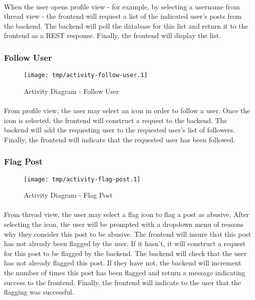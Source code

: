         \paragraph*{}
        When the user opens profile view - for example, by selecting a username from
        thread view - the frontend will request a list of the indicated user's posts
        from the backend. The backend will poll the database for this list and return
        it to the frontend as a REST response. Finally, the frontend will display the
        list.

        \subsubsection{Follow User}
        \begin{figure}[H]
            \centering
            \texttt{[image: tmp/activity-follow-user.1]} 
            \caption{Activity Diagram - Follow User}
        \end{figure}

        \paragraph*{}
        From profile view, the user may select an icon in order to follow a user. Once
        the icon is selected, the frontend will construct a request to the backend. The
        backend will add the requesting user to the requested user's list of followers.
        Finally, the frontend will indicate that the requested user has been followed.

        \subsubsection{Flag Post}
        \begin{figure}[H]
            \centering
            \texttt{[image: tmp/activity-flag-post.1]} 
            \caption{Activity Diagram - Flag Post}
        \end{figure}

        \paragraph*{}
        From thread view, the user may select a flag icon to flag a post as abusive.
        After selecting the icon, the user will be prompted with a dropdown menu of
        reasons why they consider this post to be abusive. The frontend will insure
        that this post has not already been flagged by the user. If it hasn't, it will
        construct a request for this post to be flagged by the backend. The backend
        will check that the user has not already flagged this post. If they have not,
        the backend will increment the number of times this post has been flagged and
        return a message indicating success to the frontend. Finally, the frontend will
        indicate to the user that the flagging was successful.
        
